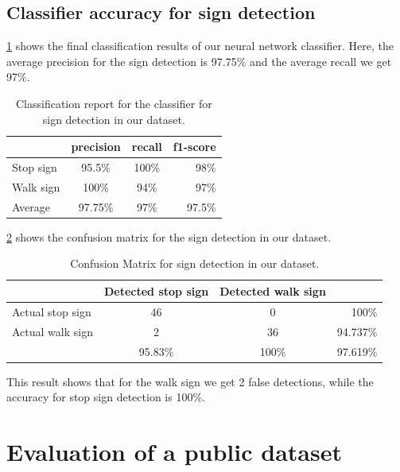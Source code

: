 \subsection{Classifier accuracy for sign detection}

\ref{t:report_walk} shows the final classification results of our neural network classifier.
Here, the average precision for the sign detection is 97.75\% and the average recall we get 97\%.

\begin{table}[h!]
  \centering
  \caption{Classification report for the classifier for sign detection in our dataset.}
  \label{t:report_walk}
  \begin{tabular}{  l  c  c  r }
    \rowcolor{gray!50}
     & precision & recall & f1-score \\
    \hline
    Stop sign & 95.5\% & 100\% & 98\% \\
    Walk sign & 100\% & 94\% & 97\% \\
    \hline  
    Average & 97.75\% & 97\% & 97.5\% \\
  \end{tabular}
\end{table}

\ref{t:walk_sign} shows the confusion matrix for the sign detection in our dataset.

\begin{table}[h!]
  \centering
  \caption{Confusion Matrix for sign detection in our dataset.}
  \label{t:walk_sign}
  \begin{tabular}{  l  c  c  r }
    \rowcolor{gray!50}
     & Detected stop sign & Detected walk sign &  \\
    \hline
    Actual stop sign & 46 & 0 & 100\% \\
    Actual walk sign & 2 & 36 & 94.737\% \\
    \hline
    & 95.83\% & 100\% & 97.619\% \\
    
  \end{tabular}
\end{table}

This result shows that for the walk sign we get 2 false detections, while the accuracy for stop sign detection is 100\%.


\section{Evaluation of a public dataset}

